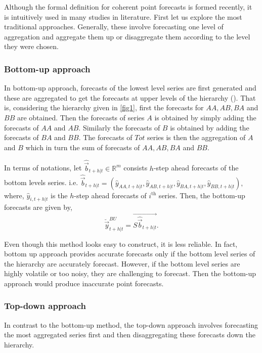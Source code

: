 \documentclass[graybox]{svmult}
\begin{document}
Although the formal definition for coherent point forecasts is formed recently, it is intuitively used in many studies in literature. First let us explore the most traditional approaches. Generally, these involve forecasting one level of aggregation and aggregate them up or disaggregate them according to the level they were chosen. 

\subsubsection{Bottom-up approach}

In bottom-up approach, forecasts of the lowest level series are first generated and these are  aggregated to get the forecasts at upper levels of the hierarchy (\cite{dunn1976}). That is, considering the hierarchy given in \ref{fig1}, first the forecasts for $AA, AB, BA$ and $BB$ are obtained. Then the forecasts of series $A$ is obtained by simply adding the forecasts of $AA$ and $AB$. Similarly the forecasts of $B$ is obtained by adding the forecasts of $BA$ and $BB$. The forecasts of  $Tot$ series is then the aggregation of $A$ and $B$ which in turn the sum of forecasts of $AA, AB, BA$ and $BB$. 

In terms of notations, let $\hat{\vec{b}}_{t+h|t} \in \mathbb{R}^m$ consists $h$-step ahead forecasts of the bottom levels series. i.e. $\hat{\vec{b}}_{t+h|t} = (\hat{{y}}_{AA,t+h|t}, \hat{{y}}_{AB,t+h|t}, \hat{{y}}_{BA,t+h|t}, \hat{{y}}_{BB,t+h|t}),$ where, $\hat{{y}}_{i,t+h|t}$ is the $h$-step ahead forecasts of $i^\text{th}$ series. Then, the bottom-up forecasts are given by,
\begin{equation}
\breve{\vec{y}}^{BU}_{t+h|t}=\vec{S\hat{\vec{b}}_{t+h|t}}.
\end{equation}

Even though this method looks easy to construct, it is less reliable. In fact, bottom up approach provides accurate forecasts only if the bottom level series of the hierarchy are accurately forecast. However, if the bottom level series are highly volatile or too noisy, they are challenging to forecast. Then the bottom-up approach would produce inaccurate point forecasts. 

\subsubsection{Top-down approach}

In contrast to the bottom-up method, the top-down approach involves forecasting the most aggregated series first and then disaggregating these forecasts down the hierarchy.  
\end{document}
